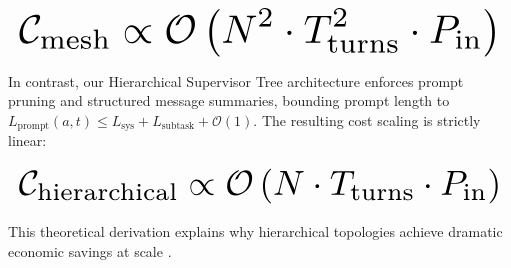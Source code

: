 \documentclass[11pt,a4paper]{article}
\begin{document}
\begin{equation}
\resizebox{\columnwidth}{!}{$\displaystyle
\begin{aligned}
\mathcal{C}_{\text{mesh}} \propto \mathcal{O}\left(N^2 \cdot T_{\text{turns}}^2 \cdot P_{\text{in}}\right)
\end{aligned}
$}
\end{equation}






















In contrast, our Hierarchical Supervisor Tree architecture enforces prompt pruning and structured message summaries, bounding prompt length to $L_{\text{prompt}}(a, t) \le L_{\text{sys}} + L_{\text{subtask}} + \mathcal{O}(1)$. The resulting cost scaling is strictly linear:






















\begin{equation}
\resizebox{\columnwidth}{!}{$\displaystyle
\begin{aligned}
\mathcal{C}_{\text{hierarchical}} \propto \mathcal{O}\left(N \cdot T_{\text{turns}} \cdot P_{\text{in}}\right)
\end{aligned}
$}
\end{equation}






















This theoretical derivation explains why hierarchical topologies achieve dramatic economic savings at scale \cite{arxiv_2501_02497}.
\end{document}
